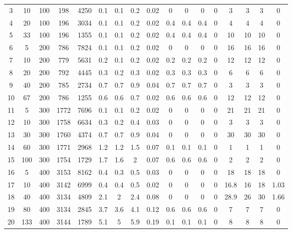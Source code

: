 \documentclass[11pt]{article}
\begin{document}
\begin{appendices}
\begin{landscape}
\begin{longtable}[c]{ccccc|cccc|cccc|cccc}
				\rowcolor[HTML]{EFEFEF} 
				3 & 10 & 100 & 198 & 4250 & 0.1 & 0.1 & 0.2 & 0.02 & 0 & 0 & 0 & 0 & 3 & 3 & 3 & 0 \\
				\rowcolor[HTML]{EFEFEF} 
				4 & 20 & 100 & 196 & 3034 & 0.1 & 0.1 & 0.2 & 0.02 & 0.4 & 0.4 & 0.4 & 0 & 4 & 4 & 4 & 0 \\
				\rowcolor[HTML]{EFEFEF} 
				5 & 33 & 100 & 196 & 1355 & 0.1 & 0.1 & 0.2 & 0.02 & 0.4 & 0.4 & 0.4 & 0 & 10 & 10 & 10 & 0 \\
				6 & 5 & 200 & 786 & 7824 & 0.1 & 0.1 & 0.2 & 0.02 & 0 & 0 & 0 & 0 & 16 & 16 & 16 & 0 \\
				7 & 10 & 200 & 779 & 5631 & 0.2 & 0.1 & 0.2 & 0.02 & 0.2 & 0.2 & 0.2 & 0 & 12 & 12 & 12 & 0 \\
				8 & 20 & 200 & 792 & 4445 & 0.3 & 0.2 & 0.3 & 0.02 & 0.3 & 0.3 & 0.3 & 0 & 6 & 6 & 6 & 0 \\
				9 & 40 & 200 & 785 & 2734 & 0.7 & 0.7 & 0.9 & 0.04 & 0.7 & 0.7 & 0.7 & 0 & 3 & 3 & 3 & 0 \\
				10 & 67 & 200 & 786 & 1255 & 0.6 & 0.6 & 0.7 & 0.02 & 0.6 & 0.6 & 0.6 & 0 & 12 & 12 & 12 & 0 \\
				\rowcolor[HTML]{EFEFEF} 
				11 & 5 & 300 & 1772 & 7696 & 0.1 & 0.1 & 0.2 & 0.02 & 0 & 0 & 0 & 0 & 21 & 21 & 21 & 0 \\
				\rowcolor[HTML]{EFEFEF} 
				12 & 10 & 300 & 1758 & 6634 & 0.3 & 0.2 & 0.4 & 0.03 & 0 & 0 & 0 & 0 & 3 & 3 & 3 & 0 \\
				\rowcolor[HTML]{EFEFEF} 
				13 & 30 & 300 & 1760 & 4374 & 0.7 & 0.7 & 0.9 & 0.04 & 0 & 0 & 0 & 0 & 30 & 30 & 30 & 0 \\
				\rowcolor[HTML]{EFEFEF} 
				14 & 60 & 300 & 1771 & 2968 & 1.2 & 1.2 & 1.5 & 0.07 & 0.1 & 0.1 & 0.1 & 0 & 1 & 1 & 1 & 0 \\
				\rowcolor[HTML]{EFEFEF} 
				15 & 100 & 300 & 1754 & 1729 & 1.7 & 1.6 & 2 & 0.07 & 0.6 & 0.6 & 0.6 & 0 & 2 & 2 & 2 & 0 \\
				16 & 5 & 400 & 3153 & 8162 & 0.4 & 0.3 & 0.5 & 0.03 & 0 & 0 & 0 & 0 & 18 & 18 & 18 & 0 \\
				17 & 10 & 400 & 3142 & 6999 & 0.4 & 0.4 & 0.5 & 0.02 & 0 & 0 & 0 & 0 & 16.8 & 16 & 18 & 1.03 \\
				18 & 40 & 400 & 3134 & 4809 & 2.1 & 2 & 2.4 & 0.08 & 0 & 0 & 0 & 0 & 28.9 & 26 & 30 & 1.66 \\
				19 & 80 & 400 & 3134 & 2845 & 3.7 & 3.6 & 4.1 & 0.12 & 0.6 & 0.6 & 0.6 & 0 & 7 & 7 & 7 & 0 \\
				20 & 133 & 400 & 3144 & 1789 & 5.1 & 5 & 5.9 & 0.19 & 0.1 & 0.1 & 0.1 & 0 & 8 & 8 & 8 & 0 \\

\end{longtable}
\end{landscape}
\end{appendices}
\end{document}
